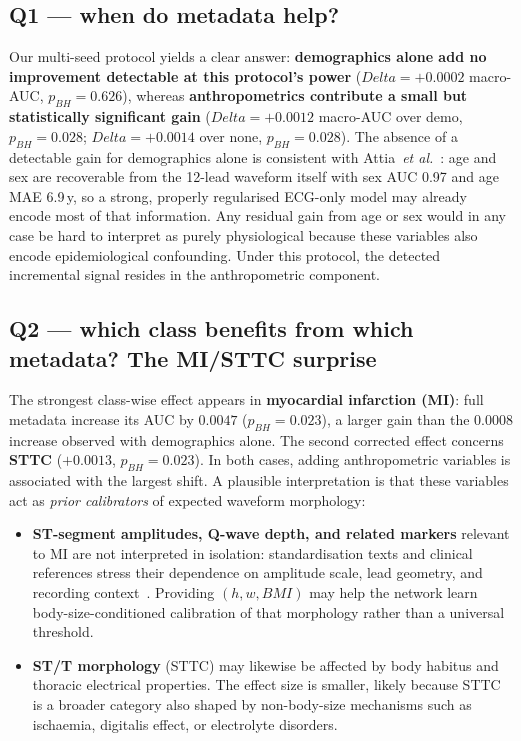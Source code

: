 \documentclass[mathematics,article,submit,pdftex]{Definitions/mdpi}
\def\texttt#1{#1}%
\def\mathrm#1{#1}%
\def\Delta{Delta }%
\begin{document}
\subsection{Q1 --- when do metadata help?}
Our multi-seed protocol yields a clear answer: \textbf{demographics alone add no improvement detectable at this protocol's power} ($\Delta{=}+0.0002$ macro-AUC, $p_{\mathrm{BH}}{=}0.626$), whereas \textbf{anthropometrics contribute a small but statistically significant gain} ($\Delta{=}+0.0012$ macro-AUC over \texttt{demo}, $p_{\mathrm{BH}}{=}0.028$; $\Delta{=}+0.0014$ over \texttt{none}, $p_{\mathrm{BH}}{=}0.028$). The absence of a detectable gain for demographics alone is consistent with Attia~\textit{et al.}~\cite{Attia2019AgeSex}: age and sex are recoverable from the 12-lead waveform itself with sex AUC 0.97 and age MAE 6.9\,y, so a strong, properly regularised ECG-only model may already encode most of that information. Any residual gain from age or sex would in any case be hard to interpret as purely physiological because these variables also encode epidemiological confounding. Under this protocol, the detected incremental signal resides in the anthropometric component.

\subsection{Q2 --- which class benefits from which metadata? The MI/STTC surprise}
The strongest class-wise effect appears in \textbf{myocardial infarction (MI)}: full metadata increase its AUC by $0.0047$ ($p_{\mathrm{BH}}{=}0.023$), a larger gain than the $0.0008$ increase observed with demographics alone. The second corrected effect concerns \textbf{STTC} ($+0.0013$, $p_{\mathrm{BH}}{=}0.023$). In both cases, adding anthropometric variables is associated with the largest shift. A plausible interpretation is that these variables act as \emph{prior calibrators} of expected waveform morphology:

\begin{itemize}[leftmargin=1.2em]
    \item \textbf{ST-segment amplitudes, Q-wave depth, and related markers} relevant to MI are not interpreted in isolation: standardisation texts and clinical references stress their dependence on amplitude scale, lead geometry, and recording context~\cite{Rautaharju2009,MacFarlane2011}. Providing $(h, w, BMI)$ may help the network learn body-size-conditioned calibration of that morphology rather than a universal threshold.
    \item \textbf{ST/T morphology} (STTC) may likewise be affected by body habitus and thoracic electrical properties. The effect size is smaller, likely because STTC is a broader category also shaped by non-body-size mechanisms such as ischaemia, digitalis effect, or electrolyte disorders.
\end{itemize}
\end{document}
